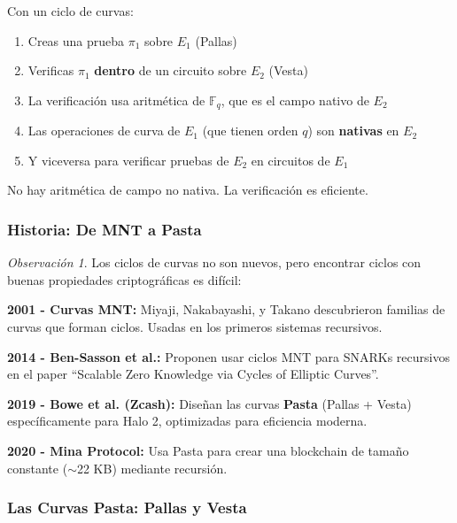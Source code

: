 \documentclass[11pt,a4paper,twoside,openright]{book}
\theoremstyle{definition}
\theoremstyle{plain}
\theoremstyle{remark}
\newtheorem{remark}{Observación}[chapter]
\begin{document}
\begin{keyidea}
Con un ciclo de curvas:
\begin{enumerate}
    \item Creas una prueba $\pi_1$ sobre $E_1$ (Pallas)
    \item Verificas $\pi_1$ \textbf{dentro} de un circuito sobre $E_2$ (Vesta)
    \item La verificación usa aritmética de $\mathbb{F}_q$, que es el campo nativo de $E_2$
    \item Las operaciones de curva de $E_1$ (que tienen orden $q$) son \textbf{nativas} en $E_2$
    \item Y viceversa para verificar pruebas de $E_2$ en circuitos de $E_1$
\end{enumerate}

No hay aritmética de campo no nativa. La verificación es eficiente.
\end{keyidea}

\subsubsection{Historia: De MNT a Pasta}

\begin{remark}
Los ciclos de curvas no son nuevos, pero encontrar ciclos con buenas propiedades criptográficas es difícil:

\textbf{2001 - Curvas MNT:} Miyaji, Nakabayashi, y Takano descubrieron familias de curvas que forman ciclos. Usadas en los primeros sistemas recursivos.

\textbf{2014 - Ben-Sasson et al.:} Proponen usar ciclos MNT para SNARKs recursivos en el paper ``Scalable Zero Knowledge via Cycles of Elliptic Curves''.

\textbf{2019 - Bowe et al. (Zcash):} Diseñan las curvas \textbf{Pasta} (Pallas + Vesta) específicamente para Halo 2, optimizadas para eficiencia moderna.

\textbf{2020 - Mina Protocol:} Usa Pasta para crear una blockchain de tamaño constante ($\sim$22 KB) mediante recursión.
\end{remark}

\subsubsection{Las Curvas Pasta: Pallas y Vesta}
\end{document}
